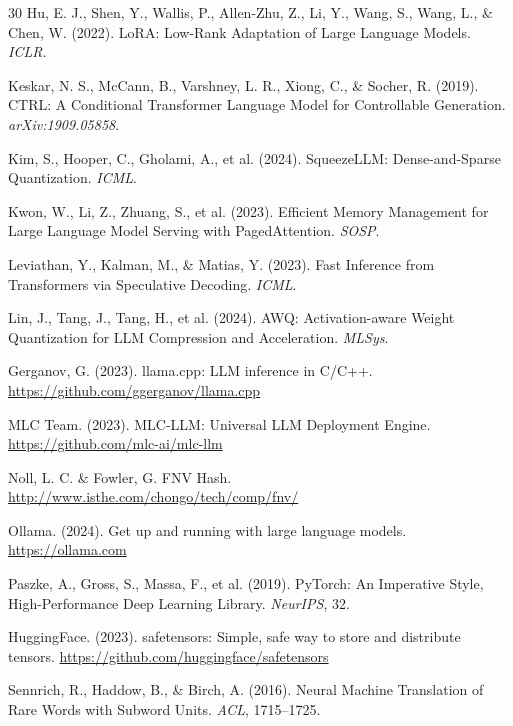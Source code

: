 \documentclass[12pt,a4paper]{article}
\begin{document}
\begin{thebibliography}{30}
Hu, E. J., Shen, Y., Wallis, P., Allen-Zhu, Z., Li, Y., Wang, S., Wang, L., \& Chen, W. (2022). LoRA: Low-Rank Adaptation of Large Language Models. \emph{ICLR}.

Keskar, N. S., McCann, B., Varshney, L. R., Xiong, C., \& Socher, R. (2019). CTRL: A Conditional Transformer Language Model for Controllable Generation. \emph{arXiv:1909.05858}.

Kim, S., Hooper, C., Gholami, A., et al. (2024). SqueezeLLM: Dense-and-Sparse Quantization. \emph{ICML}.

Kwon, W., Li, Z., Zhuang, S., et al. (2023). Efficient Memory Management for Large Language Model Serving with PagedAttention. \emph{SOSP}.

Leviathan, Y., Kalman, M., \& Matias, Y. (2023). Fast Inference from Transformers via Speculative Decoding. \emph{ICML}.

Lin, J., Tang, J., Tang, H., et al. (2024). AWQ: Activation-aware Weight Quantization for LLM Compression and Acceleration. \emph{MLSys}.

Gerganov, G. (2023). llama.cpp: LLM inference in C/C++. \url{https://github.com/ggerganov/llama.cpp}

MLC Team. (2023). MLC-LLM: Universal LLM Deployment Engine. \url{https://github.com/mlc-ai/mlc-llm}

Noll, L. C. \& Fowler, G. FNV Hash. \url{http://www.isthe.com/chongo/tech/comp/fnv/}

Ollama. (2024). Get up and running with large language models. \url{https://ollama.com}

Paszke, A., Gross, S., Massa, F., et al. (2019). PyTorch: An Imperative Style, High-Performance Deep Learning Library. \emph{NeurIPS}, 32.

HuggingFace. (2023). safetensors: Simple, safe way to store and distribute tensors. \url{https://github.com/huggingface/safetensors}

Sennrich, R., Haddow, B., \& Birch, A. (2016). Neural Machine Translation of Rare Words with Subword Units. \emph{ACL}, 1715--1725.


\end{thebibliography}
\end{document}
